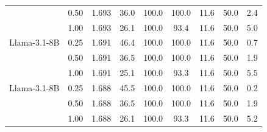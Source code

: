 \begin{tabular}{@{}lcccccccc@{}}
     & 0.50 & 1.693 & 36.0 & 100.0 & 100.0 & 11.6 & 50.0 & 2.4 \\
     & 1.00 & 1.693 & 26.1 & 100.0 & 93.4 & 11.6 & 50.0 & 5.0 \\
    Llama-3.1-8B & 0.25 & 1.691 & 46.4 & 100.0 & 100.0 & 11.6 & 50.0 & 0.7 \\
     & 0.50 & 1.691 & 36.5 & 100.0 & 100.0 & 11.6 & 50.0 & 1.9 \\
     & 1.00 & 1.691 & 25.1 & 100.0 & 93.3 & 11.6 & 50.0 & 5.5 \\
    Llama-3.1-8B & 0.25 & 1.688 & 45.5 & 100.0 & 100.0 & 11.6 & 50.0 & 0.2 \\
     & 0.50 & 1.688 & 36.5 & 100.0 & 100.0 & 11.6 & 50.0 & 1.9 \\
     & 1.00 & 1.688 & 26.1 & 100.0 & 93.3 & 11.6 & 50.0 & 5.2 \\
    \bottomrule
  \end{tabular}

